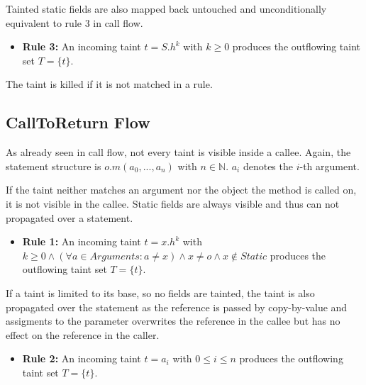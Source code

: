 \documentclass[../draft.tex]{subfiles}
\begin{document}
    Tainted static fields are also mapped back untouched and unconditionally equivalent to rule 3 in call flow.
    \begin{itemize}
        \item[] \textbf{Rule 3:} An incoming taint $t = S.h^k$ with $k \geq 0$ produces the outflowing taint set $T = \{t\}$. 
    \end{itemize}

    The taint is killed if it is not matched in a rule.
    \subsection{CallToReturn Flow}
    As already seen in call flow, not every taint is visible inside a callee. 
    Again, the statement structure is $o.m(a_0, ..., a_n)$ with $n \in \mathbb{N}$. $a_i$ denotes the $i$-th argument.

    If the taint neither matches an argument nor the object the method is called on, it is not visible in the callee. Static fields are always visible and thus can not propagated over a statement.
    \begin{itemize}
        \item[] \textbf{Rule 1:} An incoming taint $t = x.h^k$ with $k \geq 0 \land (\forall a \in \mathit{Arguments}: a \neq x) \land x \neq o \land x \notin \mathit{Static}$ produces the outflowing taint set $T = \{t\}$. 
    \end{itemize}

    If a taint is limited to its base, so no fields are tainted, the taint is also propagated over the statement as the reference is passed by copy-by-value and assigments to the parameter overwrites the reference in the callee but has no effect on the reference in the caller.
    \begin{itemize}
        \item[] \textbf{Rule 2:} An incoming taint $t = a_i$ with $0 \leq i \leq n$ produces the outflowing taint set $T = \{t\}$. 
    \end{itemize}
        
\end{document}
